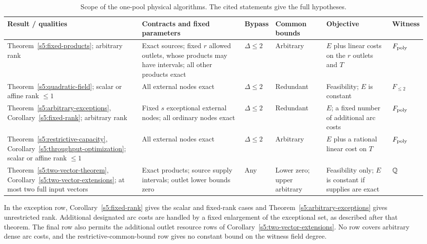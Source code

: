 \begin{table}[htbp]
\centering
\caption{Scope of the one-pool physical algorithms. The cited statements
give the full hypotheses.}
\label{s5:scope-table}
\begingroup
\footnotesize
\setlength{\tabcolsep}{3pt}
\renewcommand{\arraystretch}{1.2}
\begin{tabular}{@{}>{\raggedright\arraybackslash}p{.20\linewidth}>{\raggedright\arraybackslash}p{.27\linewidth}>{\raggedright\arraybackslash}p{.07\linewidth}>{\raggedright\arraybackslash}p{.13\linewidth}>{\raggedright\arraybackslash}p{.18\linewidth}>{\raggedright\arraybackslash}p{.08\linewidth}@{}}
\toprule
Result / qualities & Contracts and fixed parameters & Bypass & Common bounds & Objective & Witness \\
\midrule
Theorem~\ref{s5:fixed-products}; arbitrary rank
& Exact sources; fixed $r$ allowed outlets, whose products may have intervals; all other products exact
& $\Delta\le2$ & Arbitrary
& $E$ plus linear costs on the $r$ outlets and $T$ & $F_{\rm poly}$ \\
\addlinespace
Theorem~\ref{s5:quadratic-field}; scalar or affine rank $\le1$
& All external nodes exact
& $\Delta\le2$ & Redundant
& Feasibility; $E$ is constant & $F_{\le2}$ \\
\addlinespace
Theorem~\ref{s5:arbitrary-exceptions}, Corollary~\ref{s5:fixed-rank}; arbitrary rank
& Fixed $s$ exceptional external nodes; all ordinary nodes exact
& $\Delta\le2$ & Redundant
& $E$; a fixed number of additional arc costs & $F_{\rm poly}$ \\
\addlinespace
Theorem~\ref{s5:restrictive-capacity}, Corollary~\ref{s5:throughput-optimization}; scalar or affine rank $\le1$
& All external nodes exact
& $\Delta\le2$ & Arbitrary
& $E$ plus a rational linear cost on $T$ & $F_{\rm poly}$ \\
\addlinespace
Theorem~\ref{s5:two-vector-theorem}, Corollary~\ref{s5:two-vector-extensions}; at most two full input vectors
& Exact products; source supply intervals; outlet lower bounds zero
& Any & Lower zero; upper arbitrary
& Feasibility only; $E$ is constant if supplies are exact & $\mathbb Q$ \\
\bottomrule
\end{tabular}
\endgroup
\end{table}

In the exception row, Corollary~\ref{s5:fixed-rank} gives the scalar
and fixed-rank cases and Theorem~\ref{s5:arbitrary-exceptions} gives
unrestricted rank. Additional designated arc costs are handled by a fixed
enlargement of the exceptional set, as described after that
theorem. The final row also permits the additional outlet resource
rows of Corollary~\ref{s5:two-vector-extensions}. No row covers
arbitrary dense arc costs, and the restrictive-common-bound
row gives no constant bound on the witness field degree.

